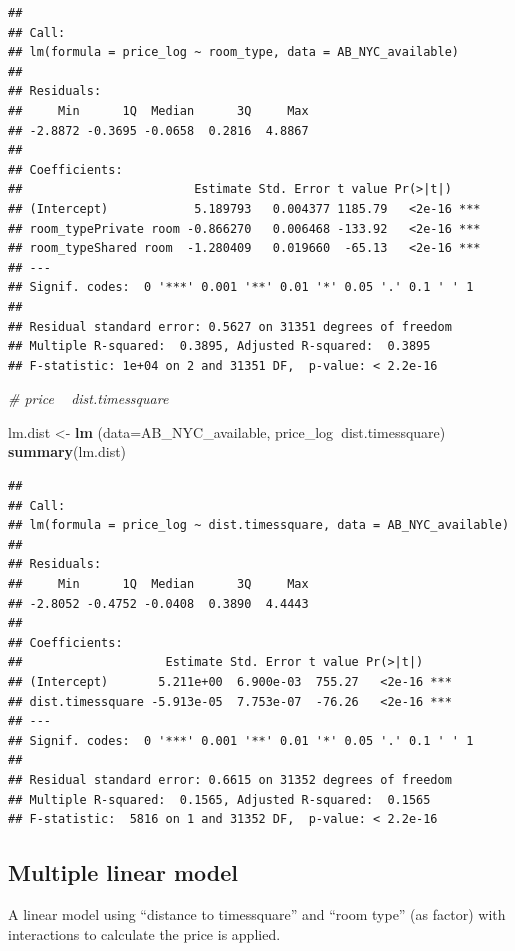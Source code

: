 \documentclass[]{article}
\newenvironment{Shaded}{\begin{snugshade}}{\end{snugshade}}
\newcommand{\CommentTok}[1]{\textcolor[rgb]{0.56,0.35,0.01}{\textit{#1}}}
\newcommand{\DataTypeTok}[1]{\textcolor[rgb]{0.13,0.29,0.53}{#1}}
\newcommand{\KeywordTok}[1]{\textcolor[rgb]{0.13,0.29,0.53}{\textbf{#1}}}
\newcommand{\NormalTok}[1]{#1}
\newcommand{\OperatorTok}[1]{\textcolor[rgb]{0.81,0.36,0.00}{\textbf{#1}}}
\newcommand{\StringTok}[1]{\textcolor[rgb]{0.31,0.60,0.02}{#1}}
\begin{document}
\begin{verbatim}
## 
## Call:
## lm(formula = price_log ~ room_type, data = AB_NYC_available)
## 
## Residuals:
##     Min      1Q  Median      3Q     Max 
## -2.8872 -0.3695 -0.0658  0.2816  4.8867 
## 
## Coefficients:
##                        Estimate Std. Error t value Pr(>|t|)    
## (Intercept)            5.189793   0.004377 1185.79   <2e-16 ***
## room_typePrivate room -0.866270   0.006468 -133.92   <2e-16 ***
## room_typeShared room  -1.280409   0.019660  -65.13   <2e-16 ***
## ---
## Signif. codes:  0 '***' 0.001 '**' 0.01 '*' 0.05 '.' 0.1 ' ' 1
## 
## Residual standard error: 0.5627 on 31351 degrees of freedom
## Multiple R-squared:  0.3895, Adjusted R-squared:  0.3895 
## F-statistic: 1e+04 on 2 and 31351 DF,  p-value: < 2.2e-16
\end{verbatim}

\begin{Shaded}
\begin{Highlighting}[]
\CommentTok{# price ~ dist.timessquare}

\NormalTok{lm.dist <-}\StringTok{ }\KeywordTok{lm}\NormalTok{ (}\DataTypeTok{data=}\NormalTok{AB_NYC_available, price_log}\OperatorTok{~}\NormalTok{dist.timessquare)}
\KeywordTok{summary}\NormalTok{(lm.dist)}
\end{Highlighting}
\end{Shaded}

\begin{verbatim}
## 
## Call:
## lm(formula = price_log ~ dist.timessquare, data = AB_NYC_available)
## 
## Residuals:
##     Min      1Q  Median      3Q     Max 
## -2.8052 -0.4752 -0.0408  0.3890  4.4443 
## 
## Coefficients:
##                    Estimate Std. Error t value Pr(>|t|)    
## (Intercept)       5.211e+00  6.900e-03  755.27   <2e-16 ***
## dist.timessquare -5.913e-05  7.753e-07  -76.26   <2e-16 ***
## ---
## Signif. codes:  0 '***' 0.001 '**' 0.01 '*' 0.05 '.' 0.1 ' ' 1
## 
## Residual standard error: 0.6615 on 31352 degrees of freedom
## Multiple R-squared:  0.1565, Adjusted R-squared:  0.1565 
## F-statistic:  5816 on 1 and 31352 DF,  p-value: < 2.2e-16
\end{verbatim}

\hypertarget{multiple-linear-model}{%
\subsection{Multiple linear model}\label{multiple-linear-model}}

A linear model using ``distance to timessquare'' and ``room type'' (as
factor) with interactions to calculate the price is applied.
\end{document}
